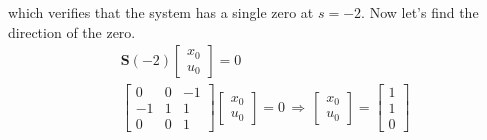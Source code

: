 \documentclass[twoside]{article}
\begin{document}
%
which verifies that the system has a single zero at $s = -2$. Now let's find the direction of the zero. 
%
\begin{align*}
&\mathbf{S}(-2) \left[ \begin{array}{c} x_0 \\ u_0 \end{array} \right] = 0
\\
&\left[ \begin{array}{ccc} 0 & 0 & - 1 \\ -1 & 1 & 1 \\ 0 & 0 & 1 \end{array} \right] \left[ \begin{array}{c} x_0 \\ \hline u_0 \end{array} \right] = 0 \, \Rightarrow \, 
\left[ \begin{array}{c} x_0 \\ \hline u_0 \end{array} \right] = 
\left[ \begin{array}{c} 1 \\ \hline 1 \\ 0 \end{array} \right]
\end{align*}
%

\end{document}
